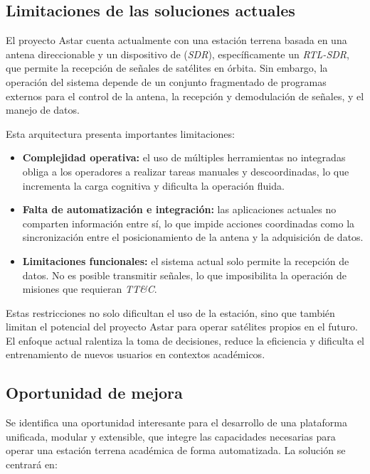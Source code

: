 \subsection*{Limitaciones de las soluciones actuales}

El proyecto Astar cuenta actualmente con una estación terrena basada en una antena direccionable y un dispositivo de (\textit{SDR}), específicamente un \textit{RTL-SDR}, que permite la recepción de señales de satélites en órbita. Sin embargo, la operación del sistema depende de un conjunto fragmentado de programas externos para el control de la antena, la recepción y demodulación de señales, y el manejo de datos.

Esta arquitectura presenta importantes limitaciones:

\begin{itemize}
    \item \textbf{Complejidad operativa:} el uso de múltiples herramientas no integradas obliga a los operadores a realizar tareas manuales y descoordinadas, lo que incrementa la carga cognitiva y dificulta la operación fluida.
    
    \item \textbf{Falta de automatización e integración:} las aplicaciones actuales no comparten información entre sí, lo que impide acciones coordinadas como la sincronización entre el posicionamiento de la antena y la adquisición de datos.
    
    \item \textbf{Limitaciones funcionales:} el sistema actual solo permite la recepción de datos. No es posible transmitir señales, lo que imposibilita la operación de misiones que requieran \textit{TT\&C}.
\end{itemize}

Estas restricciones no solo dificultan el uso de la estación, sino que también limitan el potencial del proyecto Astar para operar satélites propios en el futuro. El enfoque actual ralentiza la toma de decisiones, reduce la eficiencia y dificulta el entrenamiento de nuevos usuarios en contextos académicos.

\subsection*{Oportunidad de mejora}

Se identifica una oportunidad interesante para el desarrollo de una plataforma unificada, modular y extensible, que integre las capacidades necesarias para operar una estación terrena académica de forma automatizada. La solución se centrará en:

